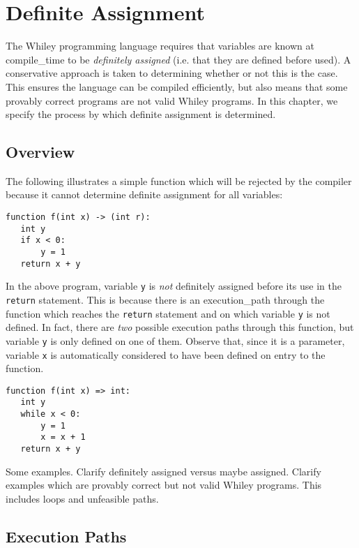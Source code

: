 \chapter{Definite Assignment}
\label{c_definite_assignment}

The Whiley programming language requires that variables are known at \gls{compile_time} to be {\em definitely assigned} (i.e. that they are defined before used).  A conservative approach is taken to determining whether or not this is the case.  This ensures the language can be compiled efficiently, but also means that some provably correct programs are not valid Whiley programs.  In this chapter, we specify the process by which definite assignment is determined.

\section{Overview}

The following illustrates a simple function which will be rejected by the compiler because it cannot determine definite assignment for all variables:

\begin{lstlisting}
function f(int x) -> (int r):
   int y
   if x < 0:
       y = 1
   return x + y
\end{lstlisting}

In the above program, variable \lstinline{y} is {\em not} definitely assigned before its use in the \lstinline{return} statement.  This is because there is an \gls{execution_path} through the function which reaches the \lstinline{return} statement and on which variable \lstinline{y} is not defined.  In fact, there are {\em two} possible execution paths through this function, but variable \lstinline{y} is only defined on one of them.  Observe that, since it is a parameter, variable \lstinline{x} is automatically considered to have been defined on entry to the function.

\begin{lstlisting}
function f(int x) => int:
   int y
   while x < 0:
       y = 1
       x = x + 1
   return x + y
\end{lstlisting}

Some examples.  Clarify definitely assigned versus maybe assigned. Clarify examples which are provably correct but not valid Whiley programs.  This includes loops and unfeasible paths.

\section{Execution Paths}

